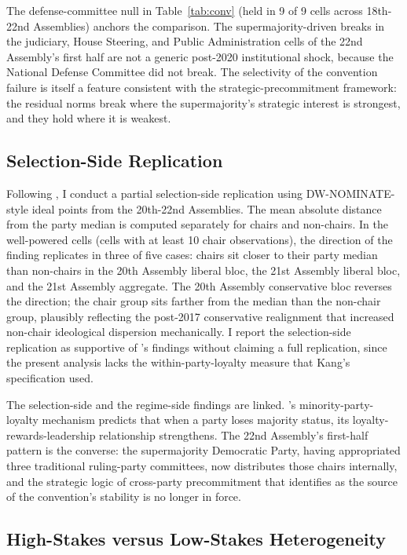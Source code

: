 \documentclass[11pt]{article}
\begin{document}
The defense-committee null in Table~\ref{tab:conv} (held in 9 of 9 cells across 18th-22nd Assemblies) anchors the comparison. The supermajority-driven breaks in the judiciary, House Steering, and Public Administration cells of the 22nd Assembly's first half are not a generic post-2020 institutional shock, because the National Defense Committee did not break. The selectivity of the convention failure is itself a feature consistent with the strategic-precommitment framework: the residual norms break where the supermajority's strategic interest is strongest, and they hold where it is weakest.

\subsection{Selection-Side Replication}

Following \citet{kang2023}, I conduct a partial selection-side replication using DW-NOMINATE-style ideal points from the 20th-22nd Assemblies. The mean absolute distance from the party median is computed separately for chairs and non-chairs. In the well-powered cells (cells with at least 10 chair observations), the direction of the \citet{kang2023} finding replicates in three of five cases: chairs sit closer to their party median than non-chairs in the 20th Assembly liberal bloc, the 21st Assembly liberal bloc, and the 21st Assembly aggregate. The 20th Assembly conservative bloc reverses the direction; the chair group sits farther from the median than the non-chair group, plausibly reflecting the post-2017 conservative realignment that increased non-chair ideological dispersion mechanically. I report the selection-side replication as supportive of \citet{kang2023}'s findings without claiming a full replication, since the present analysis lacks the within-party-loyalty measure that Kang's specification used.

The selection-side and the regime-side findings are linked. \citet{kang2023}'s minority-party-loyalty mechanism predicts that when a party loses majority status, its loyalty-rewards-leadership relationship strengthens. The 22nd Assembly's first-half pattern is the converse: the supermajority Democratic Party, having appropriated three traditional ruling-party committees, now distributes those chairs internally, and the strategic logic of cross-party precommitment that \citet{jeong2023} identifies as the source of the convention's stability is no longer in force.

\subsection{High-Stakes versus Low-Stakes Heterogeneity}
\end{document}
